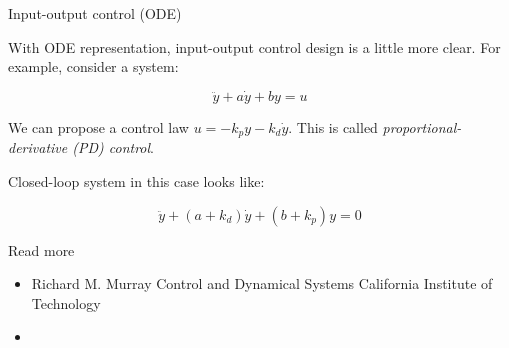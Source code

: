\documentclass{beamer}
\begin{document}
\begin{frame}{Input-output control (ODE)}
	\begin{flushleft}
		
		With ODE representation, input-output control design is a little more clear. For example, consider a system:
		
		\begin{equation}
			\ddot y + a \dot y + b y = u
		\end{equation}
	
		We can propose a control law $u = -k_p y - k_d \dot y$. This is called \emph{proportional-derivative (PD) control}. 
		
		\bigskip
		
		Closed-loop system in this case looks like:
		
		\begin{equation}
			\ddot y + (a + k_d) \dot y + (b + k_p) y = 0
		\end{equation}
		
	\end{flushleft}
\end{frame}



\begin{frame}{Read more}

\begin{itemize}
\item Richard M. Murray Control and Dynamical Systems California Institute of Technology 
\item {}
\end{itemize}
\end{frame}




\myqrframe
\end{document}
